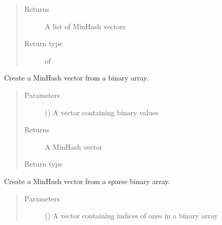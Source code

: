 \documentclass[letterpaper,10pt,english]{sphinxmanual}
\begin{document}
\begin{fulllineitems}
\begin{fulllineitems}
\begin{quote}
\begin{description}
\item[{Returns}] \leavevmode
A list of MinHash vectors

\item[{Return type}] \leavevmode
{} of 

\end{description}\end{quote}

\end{fulllineitems}


\begin{fulllineitems}
\label{\detokenize{documentation:tmap.Minhash.from_binary_array}}
Create a MinHash vector from a binary array.
\begin{quote}\begin{description}
\item[{Parameters}] \leavevmode
{} () \textendash{} A vector containing binary values

\item[{Returns}] \leavevmode
A MinHash vector

\item[{Return type}] \leavevmode
{}

\end{description}\end{quote}

\end{fulllineitems}


\begin{fulllineitems}
\label{\detokenize{documentation:tmap.Minhash.from_sparse_binary_array}}
Create a MinHash vector from a sparse binary array.
\begin{quote}\begin{description}
\item[{Parameters}] \leavevmode
{} () \textendash{} A vector containing indices of ones in a binary array


\end{description}
\end{quote}
\end{fulllineitems}
\end{fulllineitems}
\end{document}
